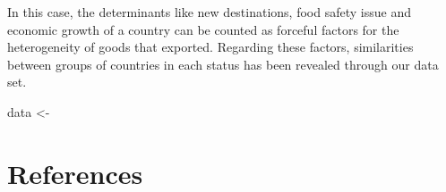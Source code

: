\documentclass[
  12pt,
]{article}
\newlength{\cslhangindent}
\newlength{\cslentryspacingunit} %
\newenvironment{CSLReferences}[2] %
 {%
  \setlength{\parindent}{0pt}
  \ifodd #1
  \let\oldpar\par
  \def\par{\hangindent=\cslhangindent\oldpar}
  \fi
  \setlength{\parskip}{#2\cslentryspacingunit}
 }%
 {}
\begin{document}
In this case, the determinants like new destinations, food safety issue and economic growth of a country can be counted as forceful factors for the heterogeneity of goods that exported. Regarding these factors, similarities between groups of countries in each status has been revealed through our data set.

data \textless-

\newpage

\hypertarget{references}{%
\section{References}\label{references}}

\hypertarget{refs}{}
\begin{CSLReferences}{0}{0}
\end{CSLReferences}
\end{document}
